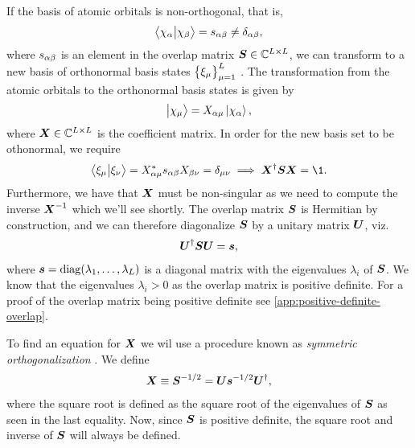             If the basis of atomic orbitals is non-orthogonal, that is,
            \begin{align}
                \braket{\chi_{\alpha}}{\chi_{\beta}}
                = s_{\alpha\beta}
                \neq \delta_{\alpha\beta},
            \end{align}
            where $s_{\alpha\beta}$ is an element in the overlap
            matrix $\boldsymbol{S} \in \mathbb{C}^{L \times L}$, we can transform
            to a new basis of orthonormal basis states $\left\{ \xi_{\mu} \right\}_{\mu =
            1}^{L}$ \cite{szabo1996modern, mayer2002lowdin}.
            The transformation from the atomic orbitals to the orthonormal basis
            states is given by
            \begin{align}
                \ket{\chi_{\mu}}
                = X_{\alpha\mu}\ket{\chi_{\alpha}},
            \end{align}
            where $\boldsymbol{X} \in \mathbb{C}^{L \times L}$ is the coefficient
            matrix.
            In order for the new basis set to be othonormal, we require
            \begin{align}
                \braket{\xi_{\mu}}{\xi_{\nu}}
                = X^{*}_{\alpha\mu}\overlapten_{\alpha\beta} X_{\beta\nu}
                = \delta_{\mu\nu}
                \implies
                \vfg{X}^{\dagger}\overlapmat\vfg{X}
                = \1.
            \end{align}
            Furthermore, we have that $\boldsymbol{X}$ must be non-singular as we need
            to compute the inverse $\boldsymbol{X}^{-1}$ which we'll see shortly.
            The overlap matrix $\boldsymbol{S}$ is Hermitian by construction, and
            we can therefore diagonalize $\boldsymbol{S}$ by a unitary matrix
            $\boldsymbol{U}$, viz.
            \begin{align}
                \boldsymbol{U}^{\dagger}\boldsymbol{S}\boldsymbol{U} = \boldsymbol{s},
            \end{align}
            where $\boldsymbol{s} = \operatorname{diag}(\lambda_1, \dots, \lambda_L)$ is a diagonal
            matrix with the eigenvalues $\lambda_i$ of $\boldsymbol{S}$.
            We know that the eigenvalues $\lambda_i > 0$ as the overlap matrix
            is positive definite.
            For a proof of the overlap matrix being positive definite see
            \autoref{app:positive-definite-overlap}.

            To find an equation for $\boldsymbol{X}$ we wil use a procedure known as
            \emph{symmetric orthogonalization} \cite{szabo1996modern,
            mayer2002lowdin}.
            We define
            \begin{align}
                \boldsymbol{X} \equiv \boldsymbol{S}^{-1/2}
                = \boldsymbol{U}\boldsymbol{s}^{-1/2}\boldsymbol{U}^{\dagger},
            \end{align}
            where the square root is defined as the square root of the
            eigenvalues of $\boldsymbol{S}$ as seen in the last equality.
            Now, since $\boldsymbol{S}$ is positive definite, the square root and
            inverse of $\boldsymbol{S}$ will always be defined.

